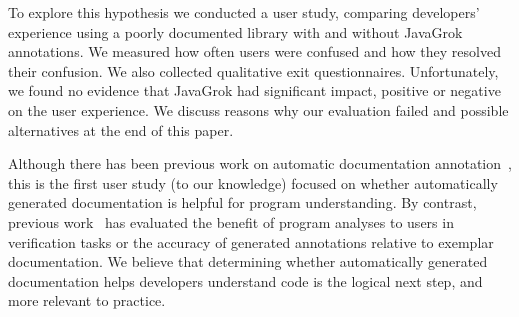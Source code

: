 To explore this hypothesis we conducted a user study, comparing developers'
experience using a poorly documented library with and without JavaGrok
annotations.  We measured how often users were confused and how they resolved their confusion.  We also collected qualitative exit
questionnaires.  Unfortunately, we found no evidence that JavaGrok had significant impact, positive or negative on the user experience.  We discuss reasons why our evaluation failed and possible alternatives at the end of this paper.

Although there has been previous work on automatic
documentation annotation~\cite{autodoc}, this is the first user study (to our knowledge)
focused on whether automatically generated documentation is helpful for program understanding.  By contrast, previous work~\cite{autodoc, Nimmer2002} has evaluated the benefit of program analyses to users in verification tasks or the accuracy of generated annotations relative to exemplar documentation.
We believe that determining whether automatically generated documentation helps
developers understand code is the logical next step, and more relevant to practice.


